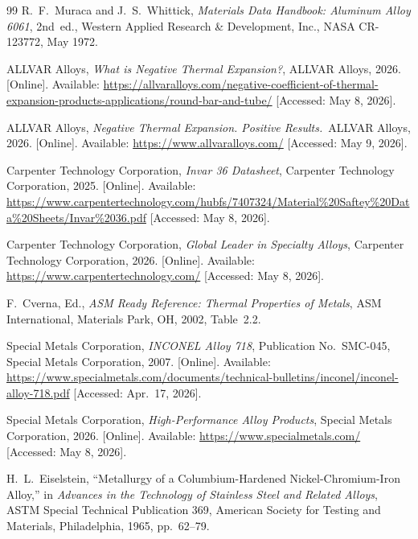 \documentclass[12pt, letterpaper]{report}%
\begin{document}
\begin{thebibliography}{99}
	R.\ F.\ Muraca and J.\ S.\ Whittick,
	\textit{Materials Data Handbook: Aluminum Alloy 6061}, 2nd~ed.,
	Western Applied Research \& Development, Inc., NASA CR-123772, May 1972.

	ALLVAR Alloys, \textit{What is Negative Thermal Expansion?},
	ALLVAR Alloys, 2026. [Online].
	Available: \url{https://allvaralloys.com/negative-coefficient-of-thermal-expansion-products-applications/round-bar-and-tube/}
	[Accessed: May 8, 2026].

	ALLVAR Alloys, \textit{Negative Thermal Expansion. Positive Results.}\
	ALLVAR Alloys, 2026. [Online].
	Available: \url{https://www.allvaralloys.com/}
	[Accessed: May 9, 2026].

	Carpenter Technology Corporation, \textit{Invar 36 Datasheet},
	Carpenter Technology Corporation, 2025. [Online].
	Available: \url{https://www.carpentertechnology.com/hubfs/7407324/Material%20Saftey%20Data%20Sheets/Invar%2036.pdf}
	[Accessed: May 8, 2026].

	Carpenter Technology Corporation, \textit{Global Leader in Specialty Alloys},
	Carpenter Technology Corporation, 2026. [Online].
	Available: \url{https://www.carpentertechnology.com/}
	[Accessed: May 8, 2026].

	F.\ Cverna, Ed., \textit{ASM Ready Reference: Thermal Properties of Metals},
	ASM International, Materials Park, OH, 2002, Table~2.2.

	Special Metals Corporation, \textit{INCONEL\textregistered{} Alloy 718},
	Publication No.\ SMC-045, Special Metals Corporation, 2007. [Online].
	Available: \url{https://www.specialmetals.com/documents/technical-bulletins/inconel/inconel-alloy-718.pdf}
	[Accessed: Apr.\ 17, 2026].

	Special Metals Corporation, \textit{High-Performance Alloy Products},
	Special Metals Corporation, 2026. [Online].
	Available: \url{https://www.specialmetals.com/}
	[Accessed: May 8, 2026].

	H.\ L.\ Eiselstein,
	``Metallurgy of a Columbium-Hardened Nickel-Chromium-Iron Alloy,''
	in \textit{Advances in the Technology of Stainless Steel and Related Alloys},
	ASTM Special Technical Publication 369,
	American Society for Testing and Materials, Philadelphia, 1965, pp.~62--79.


\end{thebibliography}
\end{document}
